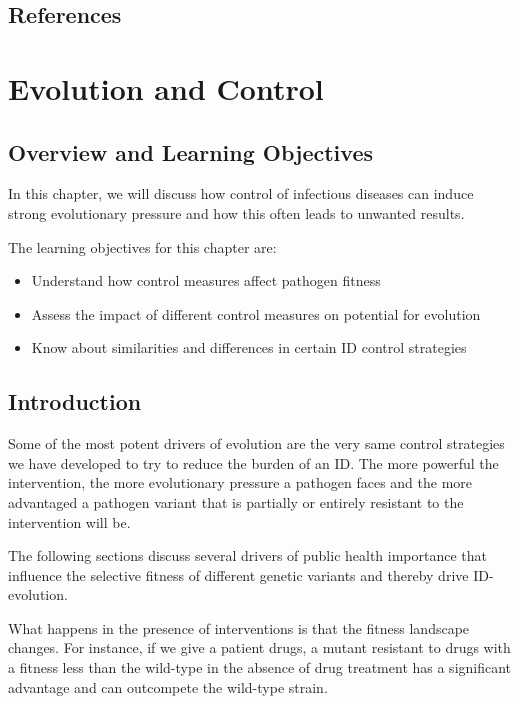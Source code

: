 \documentclass[
]{book}
\providecommand{\tightlist}{%
  \setlength{\itemsep}{0pt}\setlength{\parskip}{0pt}}
\begin{document}
\hypertarget{references-14}{%
\section{References}\label{references-14}}

\hypertarget{evolution-and-control}{%
\chapter{Evolution and Control}\label{evolution-and-control}}

\hypertarget{overview-and-learning-objectives-14}{%
\section{Overview and Learning Objectives}\label{overview-and-learning-objectives-14}}

In this chapter, we will discuss how control of infectious diseases can induce strong evolutionary pressure and how this often leads to unwanted results.

The learning objectives for this chapter are:

\begin{itemize}
\tightlist
\item
  Understand how control measures affect pathogen fitness
\item
  Assess the impact of different control measures on potential for evolution
\item
  Know about similarities and differences in certain ID control strategies
\end{itemize}

\hypertarget{introduction-14}{%
\section{Introduction}\label{introduction-14}}

Some of the most potent drivers of evolution are the very same control strategies we have developed to try to reduce the burden of an ID. The more powerful the intervention, the more evolutionary pressure a pathogen faces and the more advantaged a pathogen variant that is partially or entirely resistant to the intervention will be.

The following sections discuss several drivers of public health importance that influence the selective fitness of different genetic variants and thereby drive ID-evolution.

What happens in the presence of interventions is that the fitness landscape changes. For instance, if we give a patient drugs, a mutant resistant to drugs with a fitness less than the wild-type in the absence of drug treatment has a significant advantage and can outcompete the wild-type strain.
\end{document}

